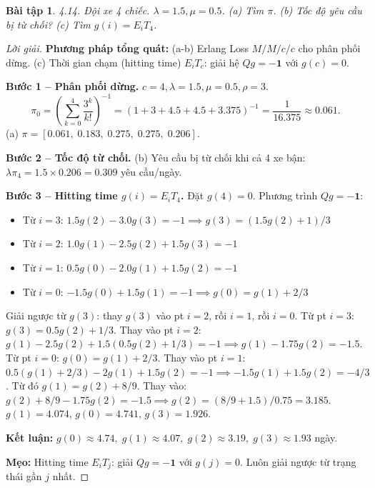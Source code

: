 \documentclass[8pt,a4paper]{article}
\newtheorem{exercise}{Bài tập}
\newenvironment{solution}{\begin{proof}[Lời giải]}{\end{proof}}
\begin{document}
\begin{exercise}
4.14. Đội xe 4 chiếc. $\lambda=1.5, \mu=0.5$. (a) Tìm $\pi$. (b) Tốc độ yêu cầu bị từ chối? (c) Tìm $g(i) = E_i T_4$.
\end{exercise}
\begin{solution}
\textbf{Phương pháp tổng quát:} (a-b) Erlang Loss $M/M/c/c$ cho phân phối dừng. (c) Thời gian chạm (hitting time) $E_i T_c$: giải hệ $Qg = -\mathbf{1}$ với $g(c)=0$.

\textbf{Bước 1 -- Phân phối dừng.} $c=4, \lambda=1.5, \mu=0.5, \rho=3$.
\[
\pi_0 = \left(\sum_{k=0}^4 \frac{3^k}{k!}\right)^{-1} = (1+3+4.5+4.5+3.375)^{-1} = \frac{1}{16.375} \approx 0.061.
\]
(a) $\pi = [0.061,\; 0.183,\; 0.275,\; 0.275,\; 0.206]$.

\textbf{Bước 2 -- Tốc độ từ chối.} (b) Yêu cầu bị từ chối khi cả 4 xe bận:
$\lambda \pi_4 = 1.5 \times 0.206 = \boxed{0.309}$ yêu cầu/ngày.

\textbf{Bước 3 -- Hitting time $g(i) = E_i T_4$.} Đặt $g(4) = 0$. Phương trình $Qg = -\mathbf{1}$:
\begin{itemize}[nosep]
\item Từ $i=3$: $1.5g(2) - 3.0g(3) = -1 \implies g(3) = (1.5g(2) + 1)/3$
\item Từ $i=2$: $1.0g(1) - 2.5g(2) + 1.5g(3) = -1$
\item Từ $i=1$: $0.5g(0) - 2.0g(1) + 1.5g(2) = -1$
\item Từ $i=0$: $-1.5g(0) + 1.5g(1) = -1 \implies g(0) = g(1) + 2/3$
\end{itemize}
Giải ngược từ $g(3)$: thay $g(3)$ vào pt $i=2$, rồi $i=1$, rồi $i=0$.
Từ pt $i=3$: $g(3) = 0.5g(2) + 1/3$.
Thay vào pt $i=2$: $g(1) - 2.5g(2) + 1.5(0.5g(2)+1/3) = -1 \implies g(1) - 1.75g(2) = -1.5$.
Từ pt $i=0$: $g(0) = g(1) + 2/3$.
Thay vào pt $i=1$: $0.5(g(1)+2/3) - 2g(1) + 1.5g(2) = -1 \implies -1.5g(1) + 1.5g(2) = -4/3$.
Từ đó $g(1) = g(2) + 8/9$. Thay vào: $g(2) + 8/9 - 1.75g(2) = -1.5 \implies g(2) = (8/9+1.5)/0.75 = 3.185$.
$g(1) = 4.074$, $g(0) = 4.741$, $g(3) = 1.926$.

\textbf{Kết luận:} $\boxed{g(0) \approx 4.74,\; g(1) \approx 4.07,\; g(2) \approx 3.19,\; g(3) \approx 1.93}$ ngày.

\textbf{Mẹo:} Hitting time $E_i T_j$: giải $Qg = -\mathbf{1}$ với $g(j)=0$. Luôn giải ngược từ trạng thái gần $j$ nhất.
\end{solution}
\end{document}
